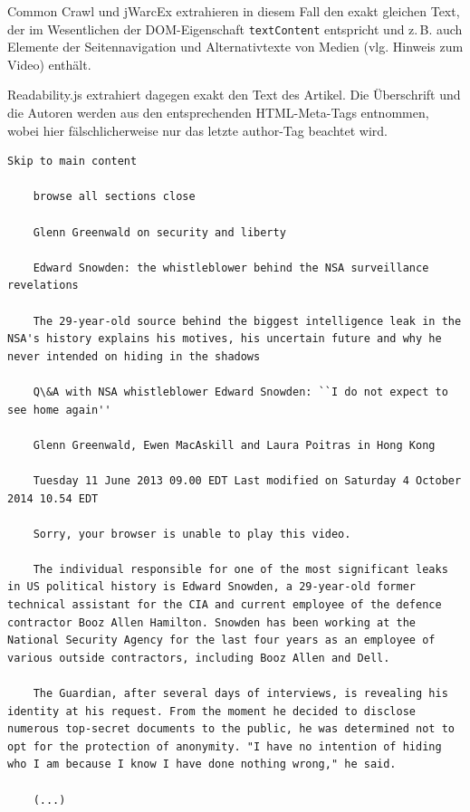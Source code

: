 \documentclass[a4paper,12pt,titlepage=false]{scrreprt}
\begin{document}
\noindent
Common Crawl und jWarcEx extrahieren in diesem Fall den exakt gleichen Text, der im Wesentlichen der DOM-Eigenschaft \texttt{textContent} entspricht und z.\,B. auch Elemente der Seitennavigation und Alternativtexte von Medien (vlg. Hinweis zum Video) enthält.

Readability.js extrahiert dagegen exakt den Text des Artikel. Die Überschrift und die Autoren werden aus den entsprechenden HTML-Meta-Tags entnommen, wobei hier fälschlicherweise nur das letzte author-Tag beachtet wird.

\begin{minipage}[t]{.5\textwidth}
    \vspace{.5cm}
    \scriptsize
    \begin{lstlisting}[breaklines=true]
    Skip to main content

    browse all sections close

    Glenn Greenwald on security and liberty

    Edward Snowden: the whistleblower behind the NSA surveillance revelations

    The 29-year-old source behind the biggest intelligence leak in the NSA's history explains his motives, his uncertain future and why he never intended on hiding in the shadows

    Q\&A with NSA whistleblower Edward Snowden: ``I do not expect to see home again''

    Glenn Greenwald, Ewen MacAskill and Laura Poitras in Hong Kong

    Tuesday 11 June 2013 09.00 EDT Last modified on Saturday 4 October 2014 10.54 EDT

    Sorry, your browser is unable to play this video.

    The individual responsible for one of the most significant leaks in US political history is Edward Snowden, a 29-year-old former technical assistant for the CIA and current employee of the defence contractor Booz Allen Hamilton. Snowden has been working at the National Security Agency for the last four years as an employee of various outside contractors, including Booz Allen and Dell.

    The Guardian, after several days of interviews, is revealing his identity at his request. From the moment he decided to disclose numerous top-secret documents to the public, he was determined not to opt for the protection of anonymity. "I have no intention of hiding who I am because I know I have done nothing wrong," he said.

    (...)
    \end{lstlisting}
\end{minipage}%
\end{document}
